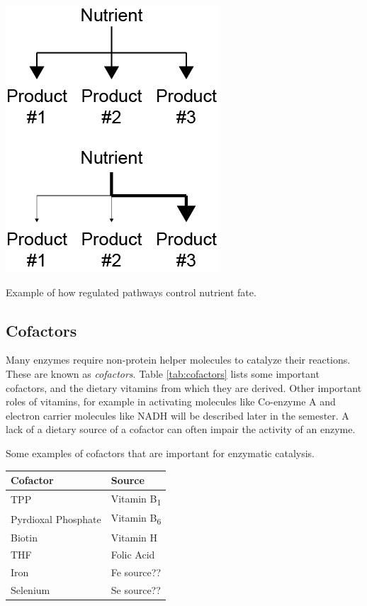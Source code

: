 \documentclass{tufte-handout}
\begin{document}
\begin{marginfigure}
\includegraphics[width=0.75\marginparwidth]{figures/nutrient-pathways.png}\
\caption{Example of how regulated pathways control nutrient fate.}
\label{fig:nutrient-pathways}
\end{marginfigure}

\subsection{Cofactors}
Many enzymes require non-protein helper molecules to catalyze their reactions.  These are known as \emph{cofactors}.  Table \ref{tab:cofactors} lists some important cofactors, and the dietary vitamins from which they are derived.  Other important roles of vitamins, for example in activating molecules like Co-enzyme A and electron carrier molecules like NADH will be described later in the semester.  A lack of a dietary source of a cofactor can often impair the activity of an enzyme.

\begin{margintable}
\caption{Some examples of cofactors that are important for enzymatic catalysis.}
\label{tab:cofactors}
\begin{tabular}{@{}ll@{}}
 \textbf{Cofactor}  & \textbf{Source}           \\ \midrule
TPP & Vitamin B\textsubscript{1} \\
Pyrdioxal Phosphate & Vitamin B\textsubscript{6} \\
Biotin & Vitamin H \\
THF & Folic Acid \\
Iron &  Fe source?? \\ 
Selenium & Se source?? \\ \bottomrule
\end{tabular}
\end{margintable}
\end{document}
